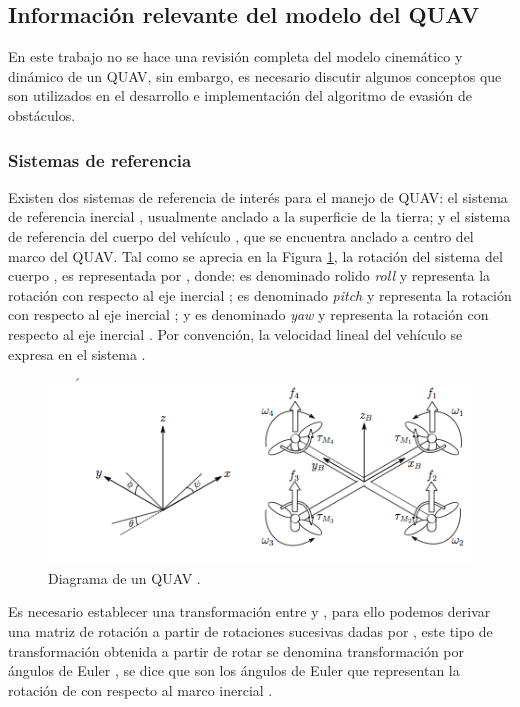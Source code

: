 \subsection{Información relevante del modelo del QUAV}

En este trabajo no se hace una revisión completa del modelo cinemático y dinámico de un QUAV, sin embargo, es necesario discutir algunos conceptos que son utilizados en el desarrollo e implementación del algoritmo de evasión de obstáculos.

\subsubsection{Sistemas de referencia}

Existen dos sistemas de referencia de interés para el manejo de QUAV: el sistema de referencia inercial , usualmente anclado a la superficie de la tierra; y el sistema de referencia del cuerpo del vehículo , que se encuentra anclado a centro del marco del QUAV. Tal como se aprecia en la Figura \ref{fig:QUAV-model}, la rotación del sistema del cuerpo , es representada por \jim{\phi,\theta,\psi} \cite{multidrone2015modeling}, donde: \jim{\phi} es denominado rolido \textit{roll} y representa la rotación con respecto al eje inercial ; \jim{\theta} es denominado \textit{pitch} y representa la rotación con respecto al eje inercial ; y \jim{\psi} es denominado \textit{yaw} y representa la rotación con respecto al eje inercial . Por convención, la velocidad lineal del vehículo  se expresa en el sistema .

\begin{figure}[H]
    \centering
    \includegraphics[scale=0.65]{partes/img/QUAV-model.png}
    \caption[Diagrama de un QUAV.]{Diagrama de un QUAV \cite{multidrone2015modeling}.} 
    \label{fig:QUAV-model}
\end{figure}

Es necesario establecer una transformación entre  y , para ello podemos derivar una matriz de rotación a partir de rotaciones sucesivas dadas por \jim{\phi,\theta,\psi}, este tipo de transformación obtenida a partir de rotar \jim{\phi,\theta,\psi} se denomina transformación por ángulos de Euler \cite{eulerAngles}, se dice que \jim{\phi,\theta,\psi} son los ángulos de Euler que representan la rotación de  con respecto al marco inercial .

